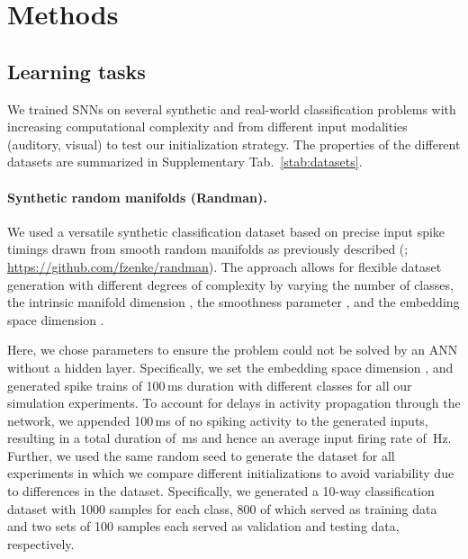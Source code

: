 \documentclass[11pt,a4paper]{article}
\begin{document}
\section*{Methods}

\subsection*{Learning tasks}

We trained \acp{SNN} on several synthetic and real-world
classification problems with increasing computational complexity and from different input modalities (auditory, visual) to test our initialization strategy. The properties of the different datasets are summarized in Supplementary Tab.~\ref{stab:datasets}.

\paragraph{Synthetic random manifolds (Randman).} 
We used a versatile synthetic classification dataset based on precise input spike timings drawn from smooth 
random manifolds as previously described (\citealp{Zenke2021-zg};  \href{https://github.com/fzenke/randman}{https://github.com/fzenke/randman}). 
The approach allows for flexible dataset generation with different degrees of complexity by varying the number of classes, the intrinsic manifold dimension , the smoothness parameter , and the embedding space dimension . 

Here, we chose parameters to ensure the problem could not be solved by an \ac{ANN} without a hidden layer. 
Specifically, we set the embedding space dimension , \mbox{} and generated spike trains of 100\,ms duration with  different classes for all our simulation experiments. 
To account for delays in activity propagation through the network, we appended 100\,ms of no spiking activity to the generated inputs, resulting in a total duration of \,ms and hence an average input firing rate of \,Hz. Further, we used the same random seed to generate the dataset for all experiments in which we compare different initializations to avoid variability due to differences in the dataset. 
Specifically, we generated a 10-way classification dataset with 1000 samples for each class, 800 of which served as training data and two sets of 100 samples each served as validation and testing data, respectively.
\end{document}
